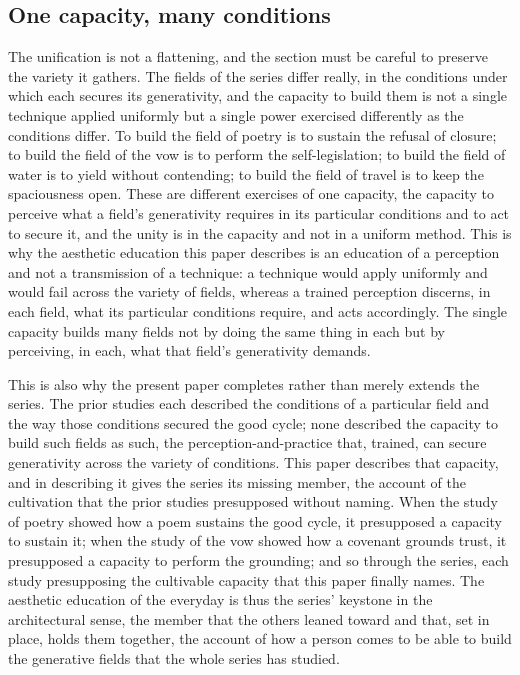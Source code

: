 \subsection{One capacity, many conditions}
\label{p22:sub:terminus-one-capacity}

The unification is not a flattening, and the section must be careful to preserve the variety it gathers. The fields of the series differ really, in the conditions under which each secures its generativity, and the capacity to build them is not a single technique applied uniformly but a single power exercised differently as the conditions differ. To build the field of poetry is to sustain the refusal of closure; to build the field of the vow is to perform the self-legislation; to build the field of water is to yield without contending; to build the field of travel is to keep the spaciousness open. These are different exercises of one capacity, the capacity to perceive what a field's generativity requires in its particular conditions and to act to secure it, and the unity is in the capacity and not in a uniform method. This is why the aesthetic education this paper describes is an education of a perception and not a transmission of a technique: a technique would apply uniformly and would fail across the variety of fields, whereas a trained perception discerns, in each field, what its particular conditions require, and acts accordingly. The single capacity builds many fields not by doing the same thing in each but by perceiving, in each, what that field's generativity demands.

This is also why the present paper completes rather than merely extends the series. The prior studies each described the conditions of a particular field and the way those conditions secured the good cycle; none described the capacity to build such fields as such, the perception-and-practice that, trained, can secure generativity across the variety of conditions. This paper describes that capacity, and in describing it gives the series its missing member, the account of the cultivation that the prior studies presupposed without naming. When the study of poetry showed how a poem sustains the good cycle, it presupposed a capacity to sustain it; when the study of the vow showed how a covenant grounds trust, it presupposed a capacity to perform the grounding; and so through the series, each study presupposing the cultivable capacity that this paper finally names. The aesthetic education of the everyday is thus the series' keystone in the architectural sense, the member that the others leaned toward and that, set in place, holds them together, the account of how a person comes to be able to build the generative fields that the whole series has studied.

